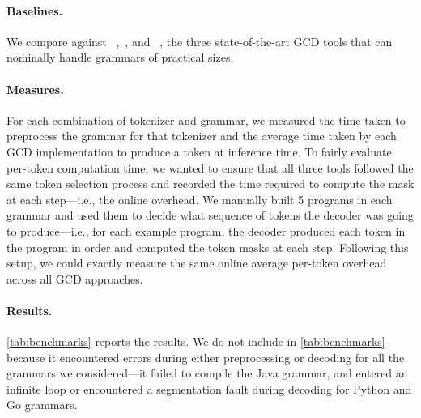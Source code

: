 \paragraph{Baselines.}
We compare \name against \outlines~\cite{willard2023efficient},\syncode~\cite{ugare2024syncode},  and \xgrammar~\cite{dong2024xgrammar}, the three state-of-the-art GCD tools that can nominally handle grammars of practical sizes.


\paragraph{Measures.}
For each combination of tokenizer and grammar, we measured the time taken to preprocess the grammar for that tokenizer and the average time taken by each GCD implementation to produce a token at inference time.
% 
To fairly evaluate per-token computation time, we wanted to ensure that all three tools followed the same token selection process and recorded the time required to compute the mask at each step---i.e., the online overhead.
% 
We manually built 5 programs in each grammar and used them to decide what sequence of tokens the decoder was going to produce---i.e., for each example program, the decoder produced each token in the program in order and computed the token masks at each step.
% 
Following this setup, we could exactly measure the same online average per-token overhead across all GCD approaches.


\paragraph{Results.}

\autoref{tab:benchmarks} reports the results.
We do not include \xgrammar in \autoref{tab:benchmarks} because it encountered errors during either preprocessing or decoding  for all the grammars we considered---it failed to compile the Java grammar, and entered an infinite loop or encountered a segmentation fault during decoding for Python and Go grammars. 


